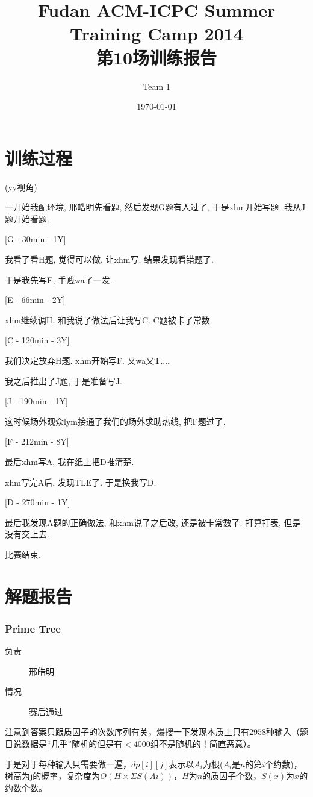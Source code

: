 \documentclass[a4paper, 11pt, nofonts, nocap, fancyhdr]{ctexart}
\title{Fudan ACM-ICPC Summer Training Camp 2014\\第10场训练报告}
\author{Team 1}
\date{\today}
\newcommand{\problem}[1]{\subsubsection{#1}}
\begin{document}
\maketitle

\section{训练过程}

(yy视角)

一开始我配环境, 邢皓明先看题, 然后发现G题有人过了, 于是xhm开始写题. 我从J题开始看题.

[G - 30min - 1Y]

我看了看H题, 觉得可以做, 让xhm写. 结果发现看错题了.

于是我先写E, 手贱wa了一发.

[E - 66min - 2Y]

xhm继续调H, 和我说了做法后让我写C. C题被卡了常数. 

[C - 120min - 3Y]

我们决定放弃H题. xhm开始写F. 又wa又T....

我之后推出了J题, 于是准备写J. 

[J - 190min - 1Y]

这时候场外观众lym接通了我们的场外求助热线, 把F题过了. 

[F - 212min - 8Y]

最后xhm写A, 我在纸上把D推清楚.

xhm写完A后, 发现TLE了. 于是换我写D. 

[D - 270min - 1Y]

最后我发现A题的正确做法, 和xhm说了之后改, 还是被卡常数了. 打算打表, 但是没有交上去.

比赛结束.

\section{解题报告}

\problem{Prime Tree}

\begin{description}
\item[负责] 邢皓明
\item[情况] 赛后通过
\end{description}

注意到答案只跟质因子的次数序列有关，爆搜一下发现本质上只有$2958$种输入（题目说数据是“几乎”随机的但是有$<4000$组不是随机的！简直恶意）。

于是对于每种输入只需要做一遍，$dp[i][j]$表示以$A_i$为根($A_i$是$n$的第$i$个约数)，树高为j的概率，复杂度为$O(H \times ΣS(Ai))$，$H$为$n$的质因子个数，$S(x)$为$x$的约数个数。
\end{document}
